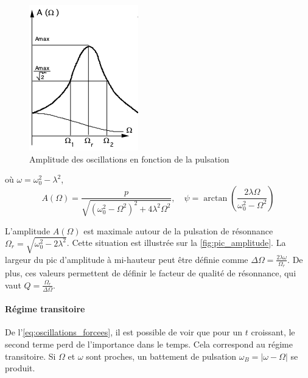 \begin{figure}
    \vspace*{-0.5cm}
    \centering
    \includegraphics[width=\linewidth]{figures/pic_amplitude.png}
    \caption{Amplitude des oscillations en fonction de la pulsation \cite{notice}}
    \label{fig:pic_amplitude}
\end{figure}
où \(\omega = \omega_0^2 - \lambda^2\), 
\begin{equation}
    A(\Omega) = \frac{p}{\sqrt{\left(\omega_0^2-\Omega^2\right)^2 + 4\lambda^2\Omega^2}}, \quad \psi = \arctan \left(\frac{2\lambda\Omega}{\omega_0^2-\Omega^2}\right)
\end{equation}

L'amplitude \(A(\Omega)\) est maximale autour de la pulsation de résonnance \(\Omega_r = \sqrt{\omega_0^2-2\lambda^2}\). Cette situation est illustrée sur la \autoref{fig:pic_amplitude}. La largeur du pic d'amplitude à mi-hauteur peut être définie comme \(\Delta \Omega = \frac{2 \lambda \omega}{\Omega_r}\). De plus, ces valeurs permettent de définir le facteur de qualité de résonnance, qui vaut \(Q = \frac{\Omega_r}{\Delta\Omega}\).

\paragraph*{Régime transitoire}
De l'\autoref{eq:oscillations_forcees}, il est possible de voir que pour un \(t\) croissant, le second terme perd de l'importance dans le temps. Cela correspond au régime transitoire. Si \(\Omega\) et \(\omega\) sont proches, un battement de pulsation \(\omega_B = |\omega- \Omega|\) se produit.
